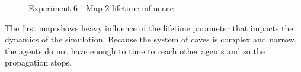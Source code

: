 \begin{figure}[H]
    \centering

    \hspace*{\fill}

    \hspace*{\fill}

    \caption{Experiment 6 - Map 2 lifetime influence}\label{fig:map2_lifetime}
\end{figure}

The first map shows heavy influence of the lifetime parameter that impacts the dynamics of the simulation.
Because the system of caves is complex and narrow, the agents do not have enough to time to reach other agents and so the propagation stops.

